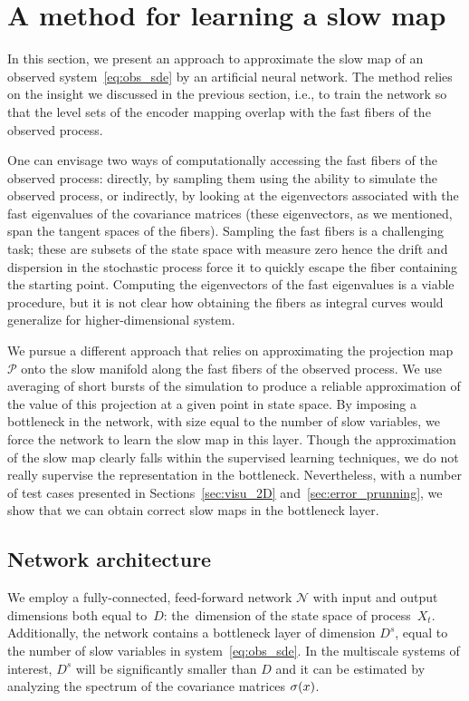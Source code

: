 \documentclass{article}
\newcommand{\net}{\mathcal{N}} %
\newcommand{\proj}{\mathcal{P}} %
\begin{document}
\section{A method for learning a slow map}\label{sec:method}
In this section, we present an approach to approximate the slow map of an observed system~\eqref{eq:obs_sde} by an artificial neural network. The method relies on the insight we discussed in the previous section, i.e., to train the network so that the level sets of the encoder mapping overlap with the fast fibers of the observed process.

One can envisage two ways of computationally accessing the fast fibers of the observed process: directly, by sampling them using the ability to simulate the observed process, or indirectly, by looking at the eigenvectors associated with the fast eigenvalues of the covariance matrices (these eigenvectors, as we mentioned, span the tangent spaces of the fibers). Sampling the fast fibers is a challenging task; these are subsets of the state space with measure zero hence the drift and dispersion in the stochastic process force it to quickly escape the fiber containing the starting point. Computing the eigenvectors of the fast eigenvalues is a viable procedure, but it is not clear how obtaining the fibers as integral curves would generalize for higher-dimensional system.

We pursue a different approach that relies on approximating the projection map $\proj$ onto the slow manifold along the fast fibers of the observed process. We use averaging of short bursts of the simulation to produce a reliable approximation of the value of this projection at a given point in state space. By imposing a bottleneck in the network, with size equal to the number of slow variables, we force the network to learn the slow map in this layer. Though the approximation of the slow map clearly falls within the supervised learning techniques, we do not really supervise the representation in the bottleneck. Nevertheless, with a number of test cases presented in Sections~\ref{sec:visu_2D} and~\ref{sec:error_prunning}, we show that we can obtain correct slow maps in the bottleneck layer.

\subsection{Network architecture}\label{sec:architecture}
We employ a fully-connected, feed-forward network $\net$ with input and output dimensions both equal to~$D$: the~dimension of the state space of process~$X_t$. Additionally, the network contains a bottleneck layer of dimension $D^s$, equal to the number of slow variables in system~\eqref{eq:obs_sde}. In the multiscale systems of interest, $D^s$ will be significantly smaller than $D$ and it can be estimated by analyzing the spectrum of the covariance matrices $\sigma(x)$.
\end{document}
